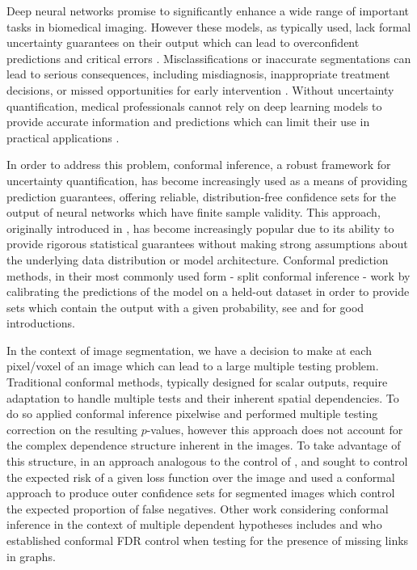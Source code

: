 Deep neural networks promise to significantly enhance a wide range of important tasks in biomedical imaging. However these models, as typically used, lack formal uncertainty guarantees on their output which can lead to overconfident predictions and critical errors \citep{Guo2017, Gupta2020}. Misclassifications or inaccurate segmentations can lead to serious consequences, including misdiagnosis, inappropriate treatment decisions, or missed opportunities for early intervention \citep{Topol2019}. Without uncertainty quantification, medical professionals cannot rely on deep learning models to provide accurate information and predictions which can limit their use in practical applications \citep{Jungo2020}. 

In order to address this problem, conformal inference, a robust framework for uncertainty quantification, has become increasingly used as a means of providing prediction guarantees, offering reliable, distribution-free confidence sets for the output of neural networks which have finite sample validity. This approach, originally introduced in \cite{Papadopoulos2002, Vovk2005}, has become increasingly popular due to its ability to provide rigorous statistical guarantees without making strong assumptions about the underlying data distribution or model architecture. Conformal prediction methods, in their most commonly used form - split conformal inference - work by calibrating the predictions of the model on a held-out dataset in order to provide sets which contain the output with a given probability, see \cite{Shafer2008} and \cite{Angelopoulos2021} for good introductions.

In the context of image segmentation, we have a decision to make at each pixel/voxel of an image which can lead to a large multiple testing problem. Traditional conformal methods, typically designed for scalar outputs, require adaptation to handle multiple tests and their inherent spatial dependencies. To do so \cite{Angelopoulos2021LTT} applied conformal inference pixelwise and performed multiple testing correction on the resulting $p$-values, however this approach does not account for the complex dependence structure inherent in the images. To take advantage of this structure, in an approach analogous to the  control of \citep{Benjamini1995}, \cite{Bates2021} and \cite{Angelopoulos2022} sought to control the expected risk of a given loss function over the image and used a conformal approach to produce outer confidence sets for segmented images which control the expected proportion of false negatives. Other work considering conformal inference in the context of multiple dependent hypotheses includes \cite{Marandon2024} and \cite{Blanchard2024} who established conformal FDR control when testing for the presence of missing links in graphs.

